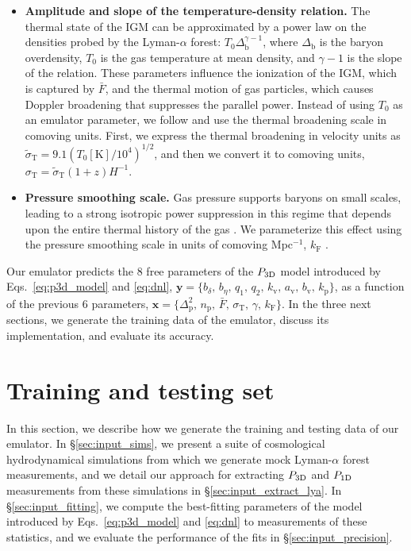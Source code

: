 \documentclass[longauth]{aa}
\newcommand{\lyaf}{Lyman-$\alpha$ forest\xspace}
\newcommand{\poned}{\ensuremath{P_{\rm 1D}}\xspace}
\newcommand{\pthreed}{\ensuremath{P_{\rm 3D}}\xspace}
\newcommand{\mflux}{\ensuremath{\bar{F}}\xspace}
\begin{document}
\begin{itemize}
    \item {\bf Amplitude and slope of the temperature-density relation.} The thermal state of the IGM can be approximated by a power law on the densities probed by the \lyaf \citep{hydro_Lukic2015}: $T_0\Delta_\mathrm{b}^{\gamma-1}$, where $\Delta_\mathrm{b}$ is the baryon overdensity, $T_0$ is the gas temperature at mean density, and $\gamma-1$ is the slope of the relation. These parameters influence the ionization of the IGM, which is captured by \mflux, and the thermal motion of gas particles, which causes Doppler broadening that suppresses the parallel power. Instead of using $T_0$ as an emulator parameter, we follow \citet{Pedersen2021} and use the thermal broadening scale in comoving units. First, we express the thermal broadening in velocity units as $\tilde{\sigma}_\mathrm{T} = 9.1 (T_0[\mathrm{K}]/10^4)^{1/2}$, and then we convert it to comoving units, $\sigma_\mathrm{T}=\tilde{\sigma}_\mathrm{T}(1+z) H^{-1}$.

    \item {\bf Pressure smoothing scale.} Gas pressure supports baryons on small scales, leading to a strong isotropic power suppression in this regime that depends upon the entire thermal history of the gas \citep{gnedin1998ProbingUniverseLyalpha}. We parameterize this effect using the pressure smoothing scale in units of comoving Mpc$^{-1}$, $k_\mathrm{F}$ \citep[see][for more details]{Pedersen2021}.
\end{itemize}

Our emulator predicts the 8 free parameters of the \pthreed model introduced by Eqs.~\ref{eq:p3d_model} and \ref{eq:dnl}, $\mathbf{y}=\{b_\delta,\, b_\eta,\, q_1,\, q_2,\, k_\mathrm{v},\, a_\mathrm{v},\, b_\mathrm{v}, \, k_\mathrm{p}\}$, as a function of the previous 6 parameters, $\mathbf{x}=\{\Delta_\mathrm{p}^2,\, n_\mathrm{p},\, \mflux,\, \sigma_\mathrm{T},\, \gamma,\, k_\mathrm{F}\}$. In the three next sections, we generate the training data of the emulator, discuss its implementation, and evaluate its accuracy.


\section{Training and testing set}
\label{sec:input}

In this section, we describe how we generate the training and testing data of our emulator. In \S\ref{sec:input_sims}, we present a suite of cosmological hydrodynamical simulations from which we generate mock \lyaf measurements, and we detail our approach for extracting \pthreed and \poned measurements from these simulations in \S\ref{sec:input_extract_lya}. In \S\ref{sec:input_fitting}, we compute the best-fitting parameters of the model introduced by Eqs.~\ref{eq:p3d_model} and \ref{eq:dnl} to measurements of these statistics, and we evaluate the performance of the fits in \S\ref{sec:input_precision}.
\end{document}
